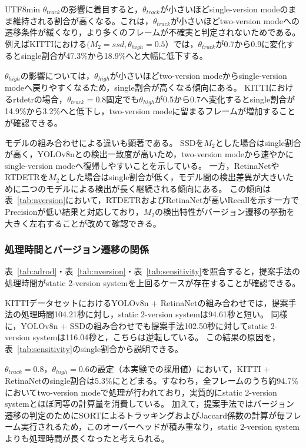 \documentclass[conference, dvipdfmx]{IEEEtran}
\begin{document}
\begin{CJK}{UTF8}{min}
$\theta_{track}$の影響に着目すると，$\theta_{track}$が小さいほどsingle-version modeのまま維持される割合が高くなる。これは，$\theta_{track}$が小さいほどtwo-version modeへの遷移条件が緩くなり，より多くのフレームが不確実と判定されないためである。
例えばKITTIにおける$(M_2 = ssd,\theta_{high}=0.5$）では，$\theta_{track}$が0.7から0.9に変化するとsingle割合が47.3\%から18.9\%へと大幅に低下する。

$\theta_{high}$の影響については，$\theta_{high}$が小さいほどtwo-version modeからsingle-version modeへ戻りやすくなるため，single割合が高くなる傾向にある。
KITTIにおけるrtdetrの場合，$\theta_{track}=0.8$固定でも$\theta_{high}$が0.5から0.7へ変化するとsingle割合が14.9\%から3.2\%へと低下し，two-version modeに留まるフレームが増加することが確認できる。

モデルの組み合わせによる違いも顕著である。
SSDを$M_2$とした場合はsingle割合が高く，YOLOv8nとの検出一致度が高いため，two-version modeから速やかにsingle-version modeへ復帰しやすいことを示している。
一方，RetinaNetやRTDETRを$M_2$とした場合はsingle割合が低く，モデル間の検出差異が大きいために二つのモデルによる検出が長く継続される傾向にある。
この傾向は表~\ref{tab:nversion}において，RTDETRおよびRetinaNetが高いRecallを示す一方でPrecisionが低い結果と対応しており，$M_2$の検出特性がバージョン遷移の挙動を大きく左右することが改めて確認できる。

\subsubsection{処理時間とバージョン遷移の関係}
表~\ref{tab:adrod}・表~\ref{tab:nversion}・表~\ref{tab:sensitivity}を照合すると，提案手法の処理時間がstatic 2-version systemを上回るケースが存在することが確認できる。

KITTIデータセットにおけるYOLOv8n + RetinaNetの組み合わせでは，提案手法の処理時間104.21秒に対し，static 2-version systemは94.61秒と短い。
同様に，YOLOv8n + SSDの組み合わせでも提案手法102.50秒に対してstatic 2-version systemは116.04秒と，こちらは逆転している。
この結果の原因を，表~\ref{tab:sensitivity}のsingle割合から説明できる。

$\theta_{track}=0.8$，$\theta_{high}=0.6$の設定（本実験での採用値）において，KITTI + RetinaNetのsingle割合は5.3\%にとどまる。すなわち，全フレームのうち約94.7\%においてtwo-version modeで処理が行われており，実質的にstatic 2-version systemとほぼ同等の計算量を消費している。
加えて，提案手法ではバージョン遷移の判定のためにSORTによるトラッキングおよびJaccard係数の計算が毎フレーム実行されるため，このオーバーヘッドが積み重なり，static 2-version systemよりも処理時間が長くなったと考えられる。


\end{CJK}
\end{document}
